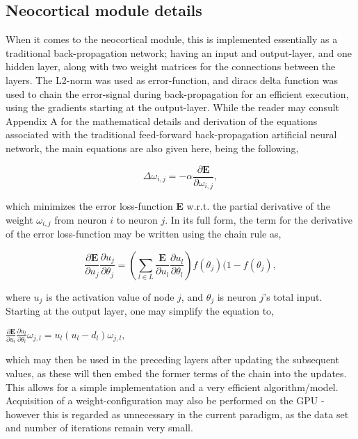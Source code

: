 \subsection{Neocortical module details}

When it comes to the neocortical module, this is implemented essentially as a traditional back-propagation network; having an input and output-layer, and one hidden layer, along with two weight matrices for the connections between the layers. The L2-norm was used as error-function, and diracs delta function was used to chain the error-signal during back-propagation for an efficient execution, using the gradients starting at the output-layer. While the reader may consult Appendix A for the mathematical details and derivation of the equations associated with the traditional feed-forward back-propagation artificial neural network, the main equations are also given here, being the following,

\begin{equation}
    \Delta \omega_{i,j} = -\alpha \frac{\partial \textbf{E}}{\partial \omega_{i,j}},
\end{equation}

\noindent
which minimizes the error loss-function \textbf{E} w.r.t. the partial derivative of the weight $\omega_{i,j}$ from neuron $i$ to neuron $j$.
In its full form, the term for the derivative of the error loss-function may be written using the chain rule as,

\begin{equation}
    \frac{\partial \textbf{E}}{\partial u_j}\frac{\partial u_j}{\partial \theta_j} = 
    (\sum_{l \in L}\frac{\textbf{E}}{\partial u_l}\frac{\partial u_l}{\partial \theta_l}) f(\theta_j)(1-f(\theta_j),
\end{equation}

\noindent
where $u_j$ is the activation value of node $j$, and $\theta_j$ is neuron $j$'s total input. Starting at the output layer, one may simplify the equation to,

\begin{center}
\begin{math}
    \frac{\partial \textbf{E}}{\partial u_l} \frac{\partial u_l}{\partial \theta_l} \omega_{j,l} = 
    u_l (u_l - d_l) \omega_{j,l},
\end{math}
\end{center}

which may then be used in the preceding layers after updating the subsequent values, as these will then embed the former terms of the chain into the updates. This allows for a simple implementation and a very efficient algorithm/model. Acquisition of a weight-configuration may also be performed on the GPU - however this is regarded as unnecessary in the current paradigm, as the data set and number of iterations remain very small.


